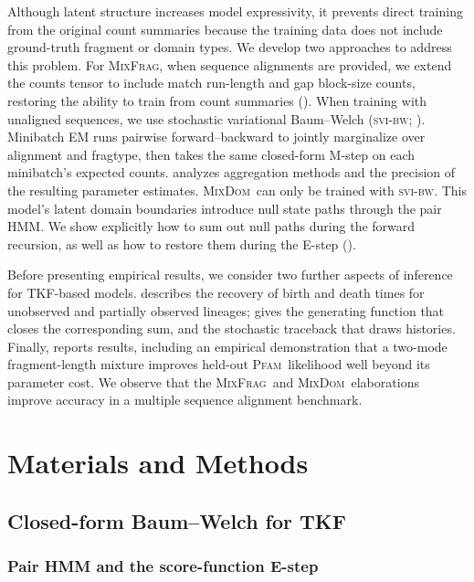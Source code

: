 \documentclass[11pt]{article}
\newcommand{\MixFrag}{\textsc{MixFrag}}
\newcommand{\MixDom}{\textsc{MixDom}}
\newcommand{\Pfam}{\textsc{Pfam}}
\newcommand{\svibw}{\textsc{svi-bw}}
\begin{document}
Although latent structure increases model expressivity, it prevents
direct training from the original count summaries because the training
data does not include ground-truth fragment or domain types. We develop
two approaches to address this problem. 
For \MixFrag, when sequence alignments are provided, we extend the counts tensor 
to include match run-length and gap block-size counts, restoring the ability 
to train from count summaries ().
When training with unaligned sequences, we use stochastic variational 
Baum--Welch (\svibw; ). Minibatch EM runs pairwise 
forward--backward to jointly marginalize over alignment and fragtype, 
then takes the same closed-form M-step on each minibatch's expected counts.
 analyzes aggregation methods and the
precision of the resulting parameter estimates.
\MixDom\ can only be trained with \svibw. This model's latent domain boundaries 
introduce null state paths through the pair HMM.
We show explicitly how to sum out null paths during the forward recursion, as well as 
how to restore them during the E-step ().

Before presenting empirical results, we consider two further
aspects of inference for TKF-based models.
 describes the recovery of birth and death times 
for unobserved and partially observed lineages;
 gives the generating function that closes
the corresponding sum, and the stochastic traceback that draws histories.
Finally,  reports results, including an
empirical demonstration that a two-mode fragment-length mixture improves
held-out \Pfam\ likelihood well beyond its parameter cost. We observe that the 
\MixFrag\ and \MixDom\ elaborations improve accuracy in a multiple 
sequence alignment benchmark.


\section{Materials and Methods}
\label{sec:methods}

\subsection{Closed-form Baum--Welch for TKF}
\label{sec:tkfem}

\subsubsection{Pair HMM and the score-function E-step}
\end{document}

